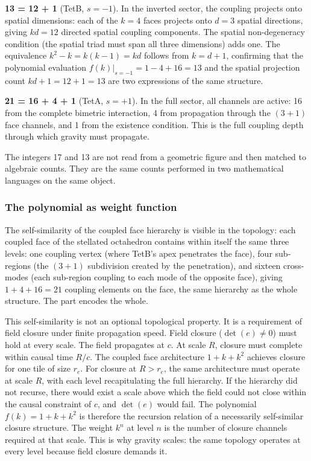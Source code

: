 \documentclass[aps,prd,preprint,superscriptaddress,showpacs,preprintnumbers,amsmath,amssymb,nofootinbib]{revtex4-2}
\begin{document}
\textbf{13 = 12 + 1} (TetB, $s = -1$). In the inverted sector, the coupling projects onto spatial dimensions: each of the $k = 4$ faces projects onto $d = 3$ spatial directions, giving $kd = 12$ directed spatial coupling components. The spatial non-degeneracy condition (the spatial triad must span all three dimensions) adds one. The equivalence $k^2 - k = k(k-1) = kd$ follows from $k = d + 1$, confirming that the polynomial evaluation $f(k)|_{s=-1} = 1 - 4 + 16 = 13$ and the spatial projection count $kd + 1 = 12 + 1 = 13$ are two expressions of the same structure.

\textbf{21 = 16 + 4 + 1} (TetA, $s = +1$). In the full sector, all channels are active: 16 from the complete bimetric interaction, 4 from propagation through the $(3{+}1)$ face channels, and 1 from the existence condition. This is the full coupling depth through which gravity must propagate.

The integers 17 and 13 are not read from a geometric figure and then matched to algebraic counts. They are the same counts performed in two mathematical languages on the same object.

\subsubsection*{The polynomial as weight function}

The self-similarity of the coupled face hierarchy is visible in the topology: each coupled face of the stellated octahedron contains within itself the same three levels: one coupling vertex (where TetB's apex penetrates the face), four sub-regions (the $(3{+}1)$ subdivision created by the penetration), and sixteen cross-modes (each sub-region coupling to each mode of the opposite face), giving $1 + 4 + 16 = 21$ coupling elements on the face, the same hierarchy as the whole structure. The part encodes the whole.

This self-similarity is not an optional topological property. It is a requirement of field closure under finite propagation speed. Field closure ($\det(e) \neq 0$) must hold at every scale. The field propagates at $c$. At scale $R$, closure must complete within causal time $R/c$. The coupled face architecture $1 + k + k^2$ achieves closure for one tile of size $r_e$. For closure at $R > r_e$, the same architecture must operate at scale $R$, with each level recapitulating the full hierarchy. If the hierarchy did not recurse, there would exist a scale above which the field could not close within the causal constraint of $c$, and $\det(e)$ would fail. The polynomial $f(k) = 1 + k + k^2$ is therefore the recursion relation of a necessarily self-similar closure structure. The weight $k^n$ at level $n$ is the number of closure channels required at that scale. This is why gravity scales: the same topology operates at every level because field closure demands it.
\end{document}
